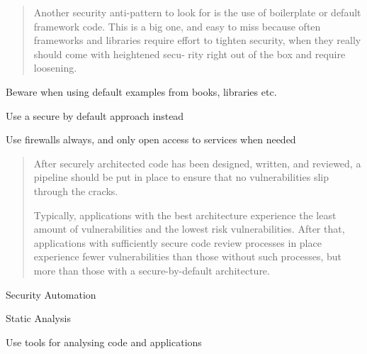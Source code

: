\documentclass[Screen16to9,17pt]{foils}
\begin{document}


\begin{quote}
Another security anti-pattern to look for is the use of boilerplate or default framework
code. This is a big one, and easy to miss because often frameworks and libraries
require effort to tighten security, when they really should come with heightened secu‐
rity right out of the box and require loosening.
\end{quote}

\begin{list2}
\item Beware when using default examples from books, libraries etc.
\item Use a secure by default approach instead
\item Use firewalls always, and only open access to services when needed
\end{list2}





\begin{quote}
After securely architected code has been designed, written, and reviewed, a pipeline should be put in place to ensure that no vulnerabilities slip through the cracks.

Typically, applications with the best architecture experience the least amount of vulnerabilities and the lowest risk vulnerabilities. After that, applications with sufficiently secure code review processes in place experience fewer vulnerabilities than those without such processes, but more than those with a secure-by-default architecture.
\end{quote}

\begin{list2}
\item Security Automation
\item Static Analysis
\item
\end{list2}





\centerline{Use tools for analysing code and applications}

\end{document}
